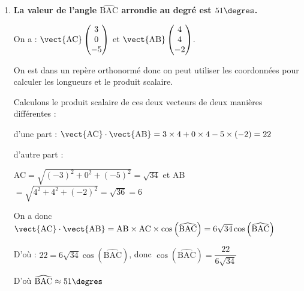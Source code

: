 \begin{enumerate}
Les vecteurs normaux sont orthogonaux donc les plans sont perpendiculaires.
\item  \textbf{La valeur de l'angle $\widehat{\mathrm{B A C}}$ arrondie au degré est  $51\degres$.}

On a : $\vect{\mathrm{AC}} \begin{pmatrix}
	3 \\ 0 \\ -5
\end{pmatrix}$ et $\vect{\mathrm{AB}} \begin{pmatrix}  4\\4\\-2
\end{pmatrix}$.

On est dans un repère orthonormé donc on peut utiliser les coordonnées pour calculer les longueurs et le produit scalaire.

Calculons le produit scalaire de ces deux vecteurs de deux manières différentes :

d'une part : $\vect{\mathrm{AC}}\cdot \vect{\mathrm{AB}} = 3\times4 + 0 \times 4 -5 \times (-2)= 22$

d'autre part :

AC$=\sqrt{(-3)^2+0^2+ (-5)^2}=\sqrt{34}$ et AB$=\sqrt{4^2+4^2+(-2)^2} =\sqrt{36} = 6$

On a donc  $\vect{\mathrm{AC}}\cdot \vect{\mathrm{AB} }= \text{AB} \times \text{AC} \times \cos \left(\widehat{\text{BAC}} \right)= 6\sqrt{34} \cos \left(\widehat{\text{BAC}} \right)$

D'où : $ 22 = 6\sqrt{34} \cos \left(\widehat{\text{BAC}}\right)$, 
donc $ \cos \left(\widehat{\text{BAC}} \right) =\dfrac{22}{6\sqrt{34}} $

D'où $ \widehat{\text{BAC}} \approx 51\degres$
\end{enumerate}
\medskip
